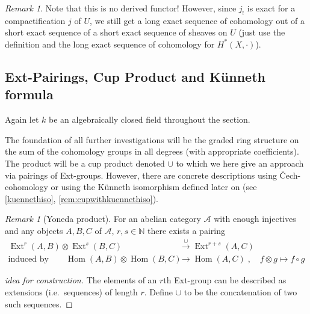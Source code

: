 \documentclass[english]{scrartcl}
\theoremstyle{definition}
\theoremstyle{remark}
\newtheorem{Rem}[Def]{Remark}
\newcommand*{\N}{\mathds{N}}
\DeclareMathOperator{\Ext}{Ext} %
\DeclareMathOperator{\Hom}{Hom} %
\newcommand*{\idest}{i.e.\ }
\begin{document}
\begin{Rem}
  Note that this is no derived functor!
  However, since $j_!$ is exact for a compactification $j$ of $U$, we
  still get a long exact sequence of cohomology out of a short exact
  sequence of a short exact sequence of sheaves on $U$
  (just use the definition and the long exact sequence of cohomology for
  $H^*(X,\cdot)$).
\end{Rem}

\subsection{Ext-Pairings, Cup Product and Künneth formula}
Again let $k$ be an algebraically closed field throughout the
section.

The foundation of all further investigations will be the graded
ring structure on the sum of the cohomology groups in all degrees
(with appropriate coefficients). The product will be a cup product
denoted $\cup$ to which we here give an approach via pairings of
Ext-groups. 
However, there are concrete descriptions using Čech-cohomology
\cite[see][Chap.~10 and Chap.~22, Cup-products]{milne}
or using the Künneth isomorphism defined later on (see
\autoref{kuennethiso}, \autoref{rem:cupwithkuennethiso}).

\begin{Rem}[Yoneda product]\label{yonedaproduct}
  For an abelian category $\mathcal{A}$ with enough injectives and
  any objects $A,B,C$ of $\mathcal{A}$, $r,s\in\N$ there exists a pairing
  \begin{align*}
    \Ext^r(A,B)\otimes\Ext^s(B,C) &\overset{\cup}{\longrightarrow}
                                    \Ext^{r+s}(A,C)
    \\
    \text{induced by}\qquad
    \Hom(A,B)\otimes\Hom(B,C) &\longrightarrow \Hom(A,C)\;,\quad
                                f\otimes g\mapsto f\circ g
  \end{align*}
  \begin{proof}[idea for construction]
    The elements of an $r$th Ext-group can be described as extensions
    (\idest sequences) of length $r$.
    Define $\cup$ to be the concatenation of two such sequences. 
  \end{proof}
\end{Rem}
\end{document}
